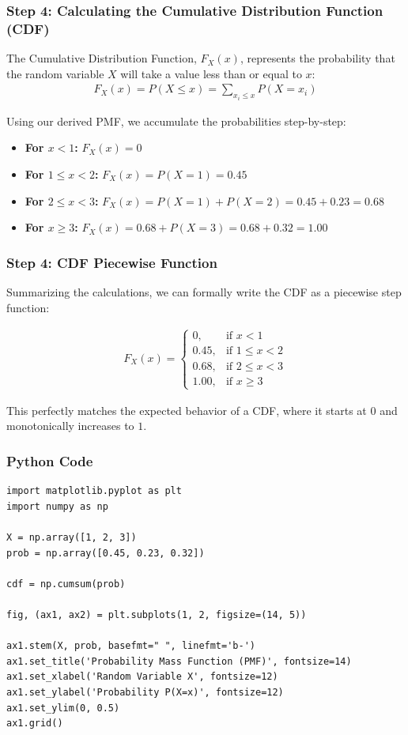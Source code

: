 \documentclass{beamer}
\begin{document}
\begin{frame}
    \frametitle{Step 4: Calculating the Cumulative Distribution Function (CDF)}
    The Cumulative Distribution Function, $F_X(x)$, represents the probability that the random variable $X$ will take a value less than or equal to $x$:
    \begin{align}
        F_X(x) = P(X \leq x) = \sum_{x_i \leq x} P(X = x_i)
    \end{align}
    
    Using our derived PMF, we accumulate the probabilities step-by-step:
    \vspace{0.2cm}
    \begin{itemize}
        \item \textbf{For $x < 1$:} $F_X(x) = 0$
        \item \textbf{For $1 \leq x < 2$:} $F_X(x) = P(X=1) = \mathbf{0.45}$
        \item \textbf{For $2 \leq x < 3$:} $F_X(x) = P(X=1) + P(X=2) = 0.45 + 0.23 = \mathbf{0.68}$
        \item \textbf{For $x \geq 3$:} $F_X(x) = 0.68 + P(X=3) = 0.68 + 0.32 = \mathbf{1.00}$
    \end{itemize}
\end{frame}

\begin{frame}
    \frametitle{Step 4: CDF Piecewise Function}
    Summarizing the calculations, we can formally write the CDF as a piecewise step function:
    
    \vspace{0.5cm}
    \begin{align}
        F_X(x) = 
        \begin{cases} 
            0, & \text{if } x < 1 \\ 
            0.45, & \text{if } 1 \leq x < 2 \\ 
            0.68, & \text{if } 2 \leq x < 3 \\ 
            1.00, & \text{if } x \geq 3 
        \end{cases}
    \end{align}
    
    \vspace{0.5cm}
    This perfectly matches the expected behavior of a CDF, where it starts at $0$ and monotonically increases to $1$.
\end{frame}

\begin{frame}[fragile]
    \frametitle{Python Code }
\begin{lstlisting}
import matplotlib.pyplot as plt
import numpy as np

X = np.array([1, 2, 3])
prob = np.array([0.45, 0.23, 0.32])

cdf = np.cumsum(prob)

fig, (ax1, ax2) = plt.subplots(1, 2, figsize=(14, 5))

ax1.stem(X, prob, basefmt=" ", linefmt='b-')
ax1.set_title('Probability Mass Function (PMF)', fontsize=14)
ax1.set_xlabel('Random Variable X', fontsize=12)
ax1.set_ylabel('Probability P(X=x)', fontsize=12)
ax1.set_ylim(0, 0.5)
ax1.grid()
\end{lstlisting}
\end{frame}
\end{document}
